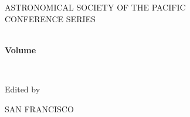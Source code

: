 \pagestyle{empty}
\null
\setlength{\headheight}{0cm}
\setlength{\headsep}{0cm}
\setlength{\textheight}{21.6cm}
\setlength{\footskip}{0cm}
\pagestyle{empty}
\begin{center}
{\large{ASTRONOMICAL SOCIETY OF THE PACIFIC\\
\vspace{3pt}
CONFERENCE SERIES}}\\
\end{center}
\begin{center}
\medskip
{\bfseries \hrulefill\\
{Volume~\volume\\
}
\vspace{-0.28truecm}
\hrulefill
}
\end{center}
\vspace{1.1truecm}
\begin{center}
{\Large \bfseries \maintitle{}\\}
\end{center}

\providemeetinginfo

\bigskip
\begin{center}
{Edited by}\\
\end{center}

\provideeditorone

\provideeditortwo

\provideeditorthree

\provideeditorfour

\provideeditorfive

\vfill
\begin{figure}[!h]
\end{figure}

\begin{center}
{\small
SAN FRANCISCO}
\end{center}

\pagebreak
